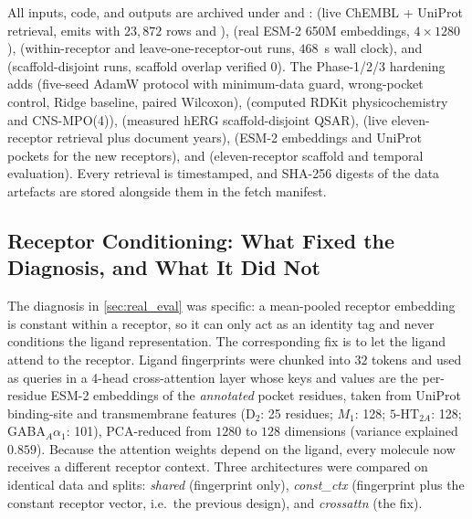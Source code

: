 All inputs, code, and outputs are archived under  and :
 (live ChEMBL + UniProt retrieval, emits  with $23{,}872$ rows and ),
 (real ESM-2 650M embeddings, $4 \times 1280$),
 (within-receptor and leave-one-receptor-out runs, $468$~s wall clock),
and  (scaffold-disjoint runs, scaffold overlap verified $0$). The Phase-1/2/3 hardening adds  (five-seed AdamW protocol with minimum-data guard, wrong-pocket control, Ridge baseline, paired Wilcoxon),  (computed RDKit physicochemistry and CNS-MPO(4)),  (measured hERG scaffold-disjoint QSAR),  (live eleven-receptor retrieval plus document years),  (ESM-2 embeddings and UniProt pockets for the new receptors), and  (eleven-receptor scaffold and temporal evaluation).
Every retrieval is timestamped, and SHA-256 digests of the data artefacts are stored alongside them in the fetch manifest.


\subsection{Receptor Conditioning: What Fixed the Diagnosis, and What It Did Not}
\label{sec:conditioning}

The diagnosis in \cref{sec:real_eval} was specific: a mean-pooled receptor embedding is constant within a receptor, so it can only act as an identity tag and never conditions the ligand representation. The corresponding fix is to let the ligand attend to the receptor. Ligand fingerprints were chunked into $32$ tokens and used as queries in a 4-head cross-attention layer whose keys and values are the per-residue ESM-2 embeddings of the \emph{annotated} pocket residues, taken from UniProt binding-site and transmembrane features (D$_2$: 25 residues; $M_1$: 128; $5\text{-HT}_{2A}$: 128; GABA$_A\alpha_1$: 101), PCA-reduced from $1280$ to $128$ dimensions (variance explained $0.859$). Because the attention weights depend on the ligand, every molecule now receives a different receptor context. Three architectures were compared on identical data and splits: \emph{shared} (fingerprint only), \emph{const\_ctx} (fingerprint plus the constant receptor vector, i.e.\ the previous design), and \emph{crossattn} (the fix).

